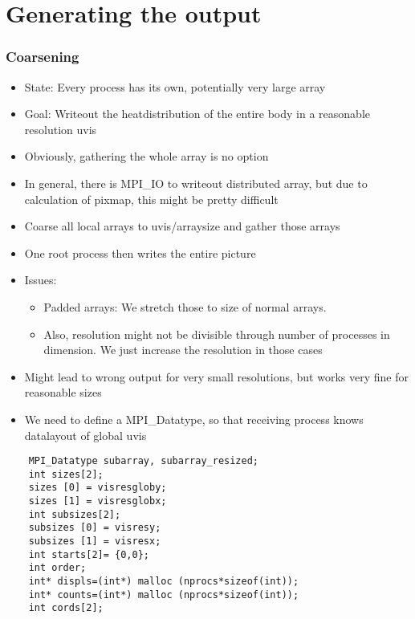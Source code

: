 \section{Generating the output}
\begin{frame}
  \frametitle{Coarsening}
  \begin{itemize}
  \item State: Every process has its own, potentially very large array
  \item Goal: Writeout the heatdistribution of the entire body in a reasonable resolution uvis
  \item Obviously, gathering the whole array is no option
  \item In general, there is MPI\_IO to writeout distributed array, but due to calculation of pixmap, this might be pretty difficult
  \end{itemize}
\end{frame}

\begin{frame}
  \begin{itemize}
  \item Coarse all local arrays to uvis/arraysize and gather those arrays
  \item One root process then writes the entire picture
  \item Issues:
    \begin{itemize}
    \item Padded arrays: We stretch those to size of normal arrays.
    \item Also, resolution might not be divisible through number of processes in dimension. We just increase the resolution in those cases
    \end{itemize}
  \item Might lead to wrong output for very small resolutions, but works very fine for reasonable sizes
  \item We need to define a MPI\_Datatype, so that receiving process knows datalayout of global uvis
  \end{itemize}
\end{frame}

\begin{frame}[fragile]
  \begin{lstlisting}
    MPI_Datatype subarray, subarray_resized;
    int sizes[2];
    sizes [0] = visresgloby;
    sizes [1] = visresglobx;
    int subsizes[2];
    subsizes [0] = visresy;
    subsizes [1] = visresx;
    int starts[2]= {0,0};
    int order;
    int* displs=(int*) malloc (nprocs*sizeof(int));
    int* counts=(int*) malloc (nprocs*sizeof(int));
    int cords[2];
  \end{lstlisting}
\end{frame}




